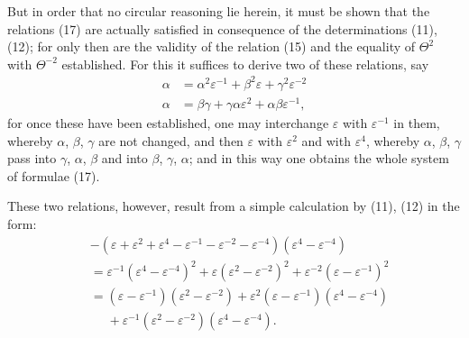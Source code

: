 But in order that no circular reasoning lie herein, it must be shown that the relations (17) are actually satisfied in consequence of the determinations (11), (12); for only then are the validity of the relation (15) and the equality of $\Theta^2$ with $\Theta^{-2}$ established. For this it suffices to derive two of these relations, say
\[ \begin{aligned}
\alpha &= \alpha^2\varepsilon^{-1} + \beta^2\varepsilon + \gamma^2\varepsilon^{-2} \\
\alpha &= \beta\gamma + \gamma\alpha\varepsilon^2 + \alpha\beta\varepsilon^{-1},
\end{aligned} \]
for once these have been established, one may interchange $\varepsilon$ with $\varepsilon^{-1}$ in them, whereby $\alpha$, $\beta$, $\gamma$ are not changed, and then $\varepsilon$ with $\varepsilon^2$ and with $\varepsilon^4$, whereby $\alpha$, $\beta$, $\gamma$ pass into $\gamma$, $\alpha$, $\beta$ and into $\beta$, $\gamma$, $\alpha$; and in this way one obtains the whole system of formulae (17).

These two relations, however, result from a simple calculation by (11), (12) in the form:
\[ \begin{aligned}
&-(\varepsilon + \varepsilon^2 + \varepsilon^4 - \varepsilon^{-1} - \varepsilon^{-2} - \varepsilon^{-4})(\varepsilon^4 - \varepsilon^{-4}) \\
&= \varepsilon^{-1}(\varepsilon^4 - \varepsilon^{-4})^2 + \varepsilon(\varepsilon^2 - \varepsilon^{-2})^2 + \varepsilon^{-2}(\varepsilon - \varepsilon^{-1})^2 \\
&= (\varepsilon - \varepsilon^{-1})(\varepsilon^2 - \varepsilon^{-2}) + \varepsilon^2(\varepsilon - \varepsilon^{-1})(\varepsilon^4 - \varepsilon^{-4}) \\
&\phantom{=} + \varepsilon^{-1}(\varepsilon^2 - \varepsilon^{-2})(\varepsilon^4 - \varepsilon^{-4}).
\end{aligned} \]
